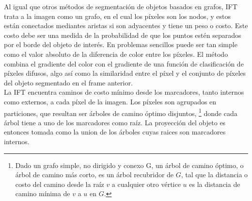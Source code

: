 \documentclass[a4paper,10pt]{article}
\begin{document}
Al igual que otros métodos de segmentación de objetos basados en grafos, IFT trata a la imagen como un grafo, en el cual los píxeles son los nodos, y
estos están conectados mediantes aristas si son adyacentes y tiene un peso o costo. Este costo debe ser una medida de la probabilidad de que
los puntos estén separados por el borde del objeto de interés. En problemas sencillos puede ser tan simple como el valor absoluto de la diferencia de color
entre los píxeles. El método combina el gradiente del color con el gradiente de una función de clasificación de píxeles difusos, algo así como la similaridad entre el píxel
y el conjunto de píxeles del objeto segmentado en el frame anterior. \\

La IFT encuentra caminos de costo mínimo desde los marcadores, tanto internos como externos, a cada píxel de la imagen. Los píxeles son agrupados en particiones, que
resultan ser árboles de camino óptimo disjuntos,
\footnote{Dado un grafo simple, no dirigido y conexo G, un árbol de camino óptimo, o árbol de camino más corto, es un árbol recubridor de $G$, tal que la distancia o
costo del camino desde la raíz $v$ a cualquier otro vértice $u$ es la distancia de camino mínima de $v$ a $u$ en $G$.}
donde cada árbol tiene a uno de los marcadores como raíz. La proyección del objeto es entonces tomada como la union de los árboles cuyas raices
son marcadores internos.\\
\end{document}
